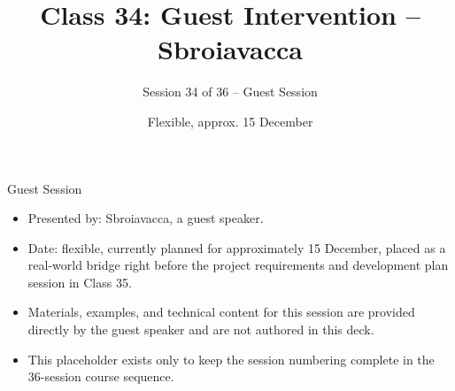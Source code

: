 

\title{Class 34: Guest Intervention -- Sbroiavacca}
\subtitle{Session 34 of 36 -- Guest Session}
\author{\coursename}
\date{Flexible, approx. 15 December}



\frame{\titlepage \coursefooter}

\begin{frame}{Guest Session}
\begin{itemize}
\item Presented by: Sbroiavacca, a guest speaker.
\item Date: flexible, currently planned for approximately 15 December, placed as a real-world bridge right before the project requirements and development plan session in Class 35.
\item Materials, examples, and technical content for this session are provided directly by the guest speaker and are not authored in this deck.
\item This placeholder exists only to keep the session numbering complete in the 36-session course sequence.
\end{itemize}
\coursefooter
\end{frame}


